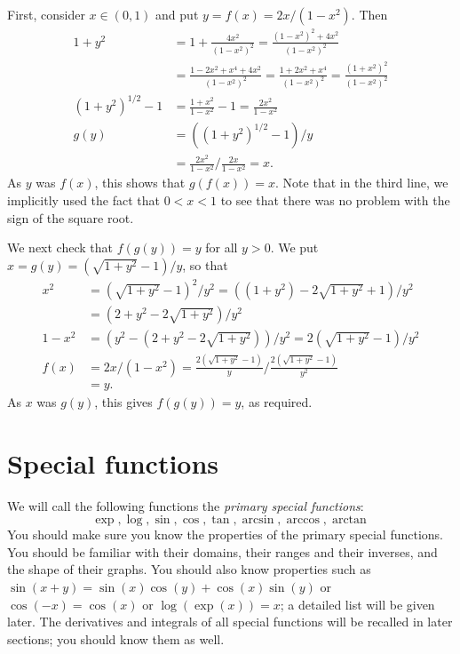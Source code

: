 \documentclass[a4paper]{book}
\newcommand{\PURPLE}[1]{{\color{purple}#1}}
\renewcommand{\:}{\colon}
\newcommand{\DEFN}[1]{\PURPLE{\emph{#1}}}
\theoremstyle{definition}
\renewenvironment{solution}{\SolutionInline}{\endSolutionInline}
\begin{document}
\begin{solution}
 First, consider $x\in(0,1)$ and put $y=f(x)=2x/(1-x^2)$.  Then 
 \begin{align*}
  1+y^2 &= 1 + \frac{4x^2}{(1-x^2)^2} = 
           \frac{(1-x^2)^2+4x^2}{(1-x^2)^2}  \\
        &= \frac{1-2x^2+x^4+4x^2}{(1-x^2)^2} =
           \frac{1+2x^2+x^4}{(1-x^2)^2} =
           \frac{(1+x^2)^2}{(1-x^2)^2} \\
  (1+y^2)^{1/2} - 1 &= \frac{1+x^2}{1-x^2} - 1 =
                       \frac{2x^2}{1-x^2} \\
  g(y) &= ((1+y^2)^{1/2}-1)/y \\
       &= \frac{2x^2}{1-x^2} / \frac{2x}{1-x^2} = x.
 \end{align*}
 As $y$ was $f(x)$, this shows that $g(f(x))=x$.  Note that in the
 third line, we implicitly used the fact that $0<x<1$ to see that
 there was no problem with the sign of the square root.

 We next check that $f(g(y))=y$ for all $y>0$.  We put
 $x=g(y)=(\sqrt{1+y^2}-1)/y$, so that
 \begin{align*}
  x^2 &= (\sqrt{1+y^2}-1)^2/y^2 = ((1+y^2) - 2 \sqrt{1+y^2} + 1)/y^2 \\
      &= (2+y^2-2\sqrt{1+y^2})/y^2 \\
  1-x^2 &= (y^2 - (2+y^2-2\sqrt{1+y^2}))/y^2 = 2(\sqrt{1+y^2}-1)/y^2 \\
  f(x) &= 2x/(1-x^2) = \frac{2(\sqrt{1+y^2}-1)}{y}/
                       \frac{2(\sqrt{1+y^2}-1)}{y^2} \\
       &= y.
 \end{align*}
 As $x$ was $g(y)$, this gives $f(g(y))=y$, as required.
\end{solution}

\chapter{Special functions}\label{chap-special}

We will call the following functions the \DEFN{primary special
  functions}:
\[ \exp, \log, \sin, \cos, \tan, \arcsin, \arccos, \arctan \]
You should make sure you know the properties of the primary special
functions.  You should be familiar with their domains, their ranges
and their inverses, and the shape of their graphs.  You should also
know properties such as $\sin(x+y)=\sin(x)\cos(y)+\cos(x)\sin(y)$ or
$\cos(-x)=\cos(x)$ or $\log(\exp(x))=x$; a detailed list will be given
later.  The derivatives and integrals of all special functions will be
recalled in later sections; you should know them as well.
\end{document}
